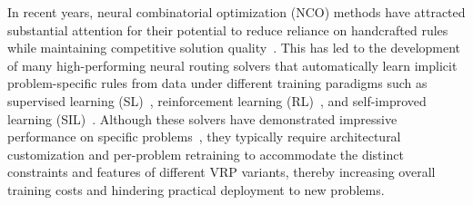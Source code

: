 \documentclass{article}
\theoremstyle{plain}
\theoremstyle{definition}
\theoremstyle{remark}
\begin{document}
In recent years, neural combinatorial optimization (NCO) methods have attracted substantial attention for their potential to reduce reliance on handcrafted rules while maintaining competitive solution quality~\citep{bengio2021machine,ba2026survey}. This has led to the development of many high-performing neural routing solvers that automatically learn implicit problem-specific rules from data under different training paradigms such as supervised learning (SL)~\citep{drakulic2023bq,luo2023lehd,luo2025insertion}, reinforcement learning (RL)~\citep{kool2019attention,zhou2024icam}, and self-improved learning (SIL)~\citep{luo2024Boosting,pirnay2024self}. Although these solvers have demonstrated impressive performance on specific problems~\citep{huang2025reld,zhou2025L2R}, they typically require architectural customization and per-problem retraining to accommodate the distinct constraints and features of different VRP variants, thereby increasing overall training costs and hindering practical deployment to new problems.
\end{document}
